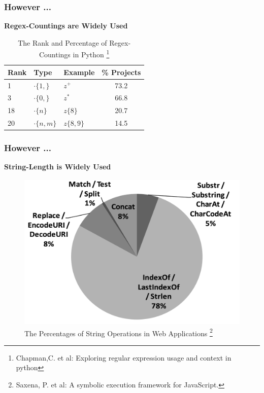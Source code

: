 \documentclass[landscape]{beamer}
\begin{document}
\begin{frame}[fragile]
  \frametitle{However ...}
  \textbf{Regex-Countings are Widely Used}
  \begin{table}
    \centering
    \begin{tabular}{l l l S[table-format=1.2]}
      \toprule
      \textbf{Rank} & \textbf{Type}  & \textbf{Example} & \textbf{\% Projects} \\
                   & $\cdot\{1,\}$  & $z^+$            & 73.2                 \\
      3             & $\cdot\{0,\}$  & $z^*$            & 66.8                 \\
      18            & $\cdot\{n\}$   & $z\{8\}$         & 20.7                 \\
      20            & $\cdot\{n,m\}$ & $z\{8,9\}$       & 14.5                 \\
      \bottomrule
    \end{tabular}
    \caption{The Rank and Percentage of Regex-Countings in Python \footnote{Chapman,C. et al: Exploring regular expression usage and context in python}}
  \end{table}

\end{frame}

\begin{frame}[fragile]
  \frametitle{However ...}
  \textbf{String-Length is Widely Used}
  \begin{figure}
    \includegraphics[width=.5\linewidth]{length_percentage.jpg}
    \caption{The Percentages of String Operations in Web Applications \footnote{Saxena, P. et al: A symbolic execution framework for JavaScript.}}
  \end{figure}
\end{frame}

\end{document}
